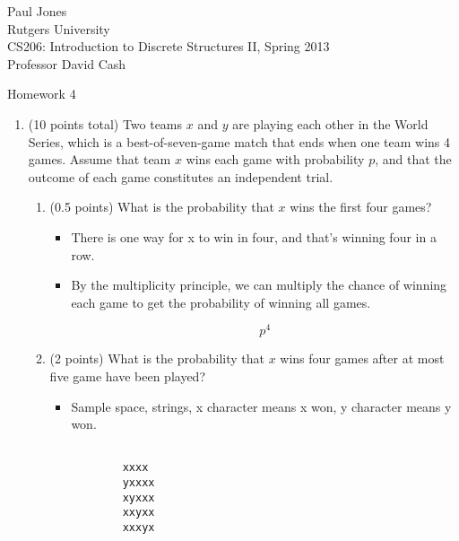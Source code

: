 \documentclass[11pt]{article}
\begin{document}
\sloppy

\noindent Paul Jones \\
Rutgers University\\
CS206: Introduction to Discrete Structures II, Spring 2013\\
Professor David Cash\\

\begin{center}
Homework 4
\end{center}

\begin{enumerate}


\item (10 points total) Two teams $x$ and $y$ are playing each other in the
World Series, which is a best-of-seven-game match that ends when one
team wins 4 games.  Assume that team $x$ wins each game with probability
$p$, and that the outcome of each game constitutes an independent trial.

\begin{enumerate}
	\item (0.5 points) What is the probability that $x$ wins the first four games?
	
	\begin{itemize}
	
		\item There is one way for x to win in four, and that's winning four in a row.
		\item By the multiplicity principle, we can multiply the chance of winning each game to get the probability of winning all games.
		
			  \[p^4\]
	
	\end{itemize}
	
	\item (2 points) What is the probability that $x$ wins four games after
	at most five game have been played?
	
	\begin{itemize}
		\item Sample space, strings, x character means x won, y character means y won.
		
		\begin{verbatim}
		
		xxxx
		yxxxx
		xyxxx
		xxyxx
		xxxyx
		
		\end{verbatim}
		

\end{itemize}
\end{enumerate}
\end{enumerate}
\end{document}
